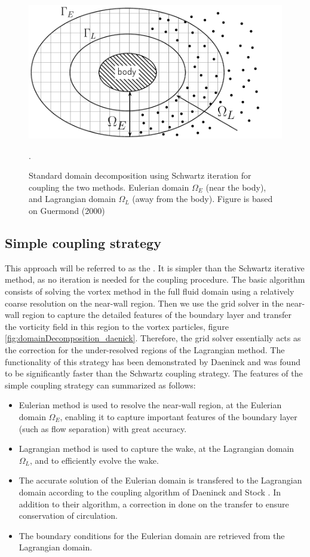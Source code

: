 	\begin{figure}[!t]
		\centering
		\includegraphics[width=0.6\linewidth]{figures/introduction/domainDecomposition_typical_type2.pdf}
		\caption{Standard domain decomposition using Schwartz iteration for coupling the two methods. Eulerian domain $\Omega_E$ (near the body), and Lagrangian domain $\Omega_L$ (away from the body). Figure is based on Guermond (2000) \cite{Guermond2000a}}.
		\label{fig:domainDecomposition}
	\end{figure}

\subsection{Simple coupling strategy}
This approach will be referred to as the . It is simpler than the Schwartz iterative method, as no iteration is needed for the coupling procedure. The basic algorithm consists of solving the vortex method in the full fluid domain using a relatively coarse resolution on the near-wall region. Then we use the grid solver in the near-wall region to capture the detailed features of the boundary layer and transfer the vorticity field in this region to the vortex particles, figure \ref{fig:domainDecomposition_daenick}. Therefore, the grid solver essentially acts as the correction for the under-resolved regions of the Lagrangian method. The functionality of this strategy has been demonstrated by Daeninck and was found to be significantly faster than the Schwartz coupling strategy. The features of the simple coupling strategy can summarized as follows:

	\begin{itemize}
	\item Eulerian method is used to resolve the near-wall region, at the Eulerian domain $\Omega_E$, enabling it to capture important features of the boundary layer (such as flow separation) with great accuracy.
	
	\item Lagrangian method is used to capture the wake, at the Lagrangian domain $\Omega_L$, and to efficiently evolve the wake.
	
	\item The accurate solution of the Eulerian domain is transfered to the Lagrangian domain according to the coupling algorithm of Daeninck \cite{Daeninck2006} and Stock \cite{Stock2010a}. In addition to their algorithm, a correction in done on the transfer to ensure conservation of circulation.
	
	\item The boundary conditions for the Eulerian domain are retrieved from the Lagrangian domain.
	\end{itemize}

